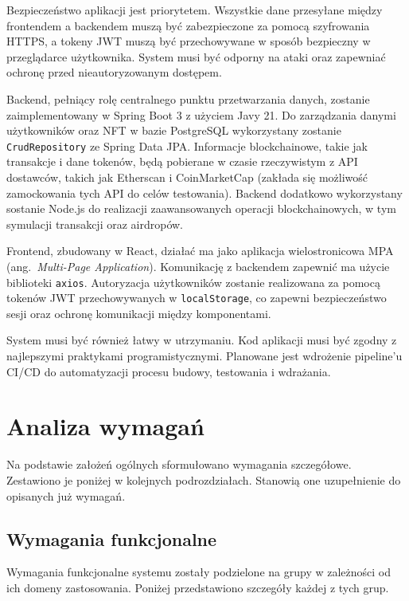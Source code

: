 Bezpieczeństwo aplikacji jest priorytetem. Wszystkie dane przesyłane między frontendem a backendem muszą być zabezpieczone za pomocą szyfrowania HTTPS, a tokeny JWT muszą być przechowywane w sposób bezpieczny w przeglądarce użytkownika. System musi być odporny na ataki oraz zapewniać ochronę przed nieautoryzowanym dostępem.

Backend, pełniący rolę centralnego punktu przetwarzania danych, zostanie zaimplementowany w Spring Boot 3 z użyciem Javy 21. Do zarządzania danymi użytkowników oraz NFT w bazie PostgreSQL wykorzystany zostanie \texttt{CrudRepository} ze Spring Data JPA. Informacje blockchainowe, takie jak transakcje i dane tokenów, będą pobierane w czasie rzeczywistym z API dostawców, takich jak Etherscan i CoinMarketCap (zakłada się możliwość zamockowania tych API do celów testowania). Backend dodatkowo wykorzystany sostanie Node.js do realizacji zaawansowanych operacji blockchainowych, w tym symulacji transakcji oraz airdropów.

Frontend, zbudowany w React, działać ma jako aplikacja wielostronicowa MPA (ang.~\emph{Multi-Page Application}). Komunikację z backendem zapewnić ma użycie biblioteki \texttt{axios}. Autoryzacja użytkowników zostanie realizowana za pomocą tokenów JWT przechowywanych w \texttt{localStorage}, co zapewni bezpieczeństwo sesji oraz ochronę komunikacji między komponentami.

System musi być również łatwy w utrzymaniu. Kod aplikacji musi być zgodny z najlepszymi praktykami programistycznymi. Planowane jest wdrożenie pipeline’u CI/CD do automatyzacji procesu budowy, testowania i wdrażania.




\section{Analiza wymagań}
Na podstawie założeń ogólnych sformułowano wymagania szczegółowe. Zestawiono je poniżej w kolejnych podrozdziałach. Stanowią one uzupełnienie do opisanych już wymagań. 
\subsection{Wymagania funkcjonalne}
Wymagania funkcjonalne systemu zostały podzielone na grupy w zależności od ich domeny zastosowania. Poniżej przedstawiono szczegóły każdej z tych grup.
